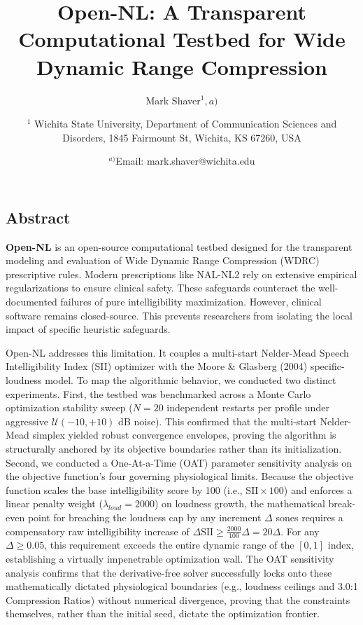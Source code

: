 \documentclass[
  12pt,
]{article}
\title{Open-NL: A Transparent Computational Testbed for Wide Dynamic
Range Compression}
\author{Mark
Shaver\(^1,a)\) \and \parbox{\textwidth}{\centering $^1$ Wichita State University, Department of Communication Sciences and Disorders, 1845 Fairmount St, Wichita, KS 67260, USA} \and \(^{a)}\)Email:
mark.shaver@wichita.edu}
\date{}
\begin{document}
\maketitle

\linenumbers

\subsection{Abstract}\label{abstract}

\textbf{Open-NL} is an open-source computational testbed designed for
the transparent modeling and evaluation of Wide Dynamic Range
Compression (WDRC) prescriptive rules. Modern prescriptions like NAL-NL2
rely on extensive empirical regularizations to ensure clinical safety.
These safeguards counteract the well-documented failures of pure
intelligibility maximization. However, clinical software remains
closed-source. This prevents researchers from isolating the local impact
of specific heuristic safeguards.

Open-NL addresses this limitation. It couples a multi-start Nelder-Mead
Speech Intelligibility Index (SII) optimizer with the Moore \& Glasberg
(2004) specific-loudness model. To map the algorithmic behavior, we
conducted two distinct experiments. First, the testbed was benchmarked
across a Monte Carlo optimization stability sweep (\(N=20\) independent
restarts per profile under aggressive \(\mathcal{U}(-10, +10)\) dB
noise). This confirmed that the multi-start Nelder-Mead simplex yielded
robust convergence envelopes, proving the algorithm is structurally
anchored by its objective boundaries rather than its initialization.
Second, we conducted a One-At-a-Time (OAT) parameter sensitivity
analysis on the objective function's four governing physiological
limits. Because the objective function scales the base intelligibility
score by 100 (i.e., \(\text{SII} \times 100\)) and enforces a linear
penalty weight (\(\lambda_{loud} = 2000\)) on loudness growth, the
mathematical break-even point for breaching the loudness cap by any
increment \(\Delta\) sones requires a compensatory raw intelligibility
increase of \(\Delta \text{SII} \ge \frac{2000}{100}\Delta = 20\Delta\).
For any \(\Delta \ge 0.05\), this requirement exceeds the entire dynamic
range of the \([0,1]\) index, establishing a virtually impenetrable
optimization wall. The OAT sensitivity analysis confirms that the
derivative-free solver successfully locks onto these mathematically
dictated physiological boundaries (e.g., loudness ceilings and 3.0:1
Compression Ratios) without numerical divergence, proving that the
constraints themselves, rather than the initial seed, dictate the
optimization frontier.
\end{document}

